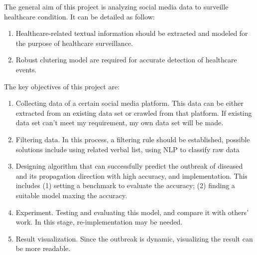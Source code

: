 The general aim of this project is analyzing social media data to surveille healthcare condition. It can be detailed as follow:
\begin{enumerate}
    \item Healthcare-related textual information should be extracted and modeled for the purpose of healthcare surveillance.
    \item Robust clutering model are required for accurate detection of healthcare events.
\end{enumerate}

The key objectives of this project are:

\begin{enumerate}
    \item Collecting data of a certain social media platform. This data can be either extracted from an existing data set or crawled from that platform. If existing data set can’t meet my requirement, my own data set will be made.
    \item Filtering data. In this process, a filtering rule should be established, possible solutions include using related verbal list, using NLP to classify raw data
    \item Designing algorithm that can successfully predict the outbreak of diseased and its propagation direction with high accuracy, and implementation. This includes (1) setting a benchmark to evaluate the accuracy; (2) finding a suitable model maxing the accuracy.
    \item Experiment. Testing and evaluating this model, and compare it with others’ work. In this stage, re-implementation may be needed.
    \item Result visualization. Since the outbreak is dynamic, visualizing the result can be more readable.
\end{enumerate}